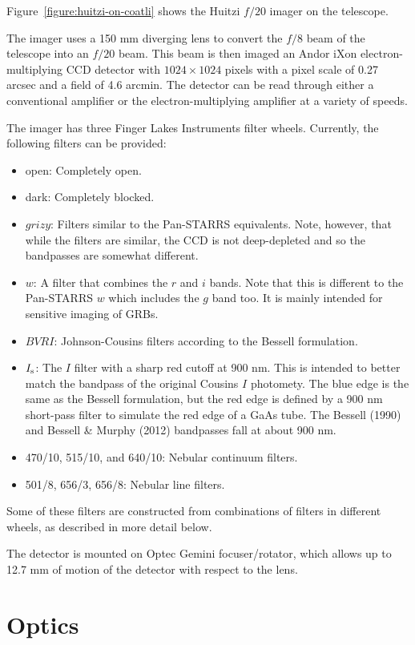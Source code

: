 Figure~\ref{figure:huitzi-on-coatli} shows the Huitzi $f/20$ imager on the telescope.

The imager uses a 150 mm diverging lens to convert the $f/8$ beam of the telescope into an $f/20$ beam. This beam is then imaged an Andor iXon electron-multiplying CCD detector with $1024\times1024$ pixels with a pixel scale of 0.27 arcsec and a field of 4.6 arcmin. The detector can be read through either a conventional amplifier or the electron-multiplying amplifier at a variety of speeds.

The imager has three Finger Lakes Instruments filter wheels. Currently, the following filters can be provided:

\begin{itemize}
\item open: Completely open.
\item dark: Completely blocked.
\item $grizy$: Filters similar to the Pan-STARRS equivalents. Note, however, that while the filters are similar, the CCD is not deep-depleted and so the bandpasses are somewhat different.
\item $w$: A filter that combines the $r$ and $i$ bands. Note that this is different to the Pan-STARRS $w$ which includes the $g$ band too. It is mainly intended for sensitive imaging of GRBs.
\item $BVRI$: Johnson-Cousins filters according to the Bessell formulation.
\item $\mbox{$I_\mathrm{s}$}$: The $I$ filter with a sharp red cutoff at 900 nm. This is intended to better match the bandpass of the original Cousins $I$ photomety. The blue edge is the same as the Bessell formulation, but the red edge is defined by a 900 nm short-pass filter to simulate the red edge of a GaAs tube. The Bessell (1990) and Bessell \& Murphy (2012) bandpasses fall at about 900 nm.
\item 470/10, 515/10, and 640/10: Nebular continuum filters.
\item 501/8, 656/3, 656/8: Nebular line filters.
\end{itemize}

Some of these filters are constructed from combinations of filters in different wheels, as described in more detail below.

The detector is mounted on Optec Gemini focuser/rotator, which allows up to 12.7 mm of motion of the detector with respect to the lens.

\section{Optics}

